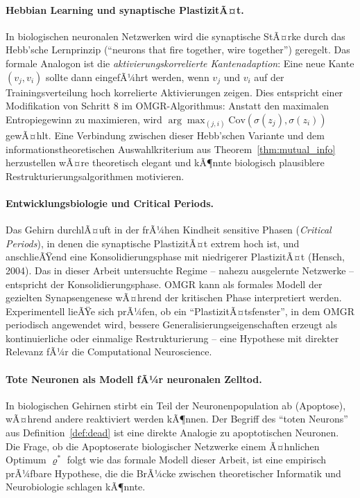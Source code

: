 ﻿\documentclass[12pt, a4paper, openany]{report}
\begin{document}
\paragraph{Hebbian Learning und synaptische PlastizitÃ¤t.}
In biologischen neuronalen Netzwerken wird die synaptische StÃ¤rke durch
das Hebb'sche Lernprinzip (``neurons that fire together, wire together'')
geregelt.  Das formale Analogon ist die \emph{aktivierungskorrelierte
Kantenadaption}: Eine neue Kante $(v_j, v_i)$ sollte dann eingefÃ¼hrt
werden, wenn $v_j$ und $v_i$ auf der Trainingsverteilung hoch korrelierte
Aktivierungen zeigen.  Dies entspricht einer Modifikation von Schritt 8 im
OMGR-Algorithmus: Anstatt den maximalen Entropiegewinn zu maximieren,
wird $\arg\max_{(j,i)} \mathrm{Cov}(\sigma(z_j), \sigma(z_i))$ gewÃ¤hlt.
Eine Verbindung zwischen dieser Hebb'schen Variante und dem
informationstheoretischen Auswahlkriterium aus Theorem~\ref{thm:mutual_info}
herzustellen wÃ¤re theoretisch elegant und kÃ¶nnte biologisch plausiblere
Restrukturierungsalgorithmen motivieren.

\paragraph{Entwicklungsbiologie und Critical Periods.}
Das Gehirn durchlÃ¤uft in der frÃ¼hen Kindheit sensitive Phasen
(\emph{Critical Periods}), in denen die synaptische PlastizitÃ¤t extrem
hoch ist, und anschlieÃŸend eine Konsolidierungsphase mit niedrigerer
PlastizitÃ¤t (Hensch, 2004).  Das in dieser Arbeit untersuchte Regime --
nahezu ausgelernte Netzwerke -- entspricht der Konsolidierungsphase.
OMGR kann als formales Modell der gezielten Synapsengenese wÃ¤hrend
der kritischen Phase interpretiert werden.  Experimentell lieÃŸe sich
prÃ¼fen, ob ein ``PlastizitÃ¤tsfenster'', in dem OMGR periodisch angewendet
wird, bessere Generalisierungseigenschaften erzeugt als kontinuierliche
oder einmalige Restrukturierung -- eine Hypothese mit direkter
Relevanz fÃ¼r die Computational Neuroscience.

\paragraph{Tote Neuronen als Modell fÃ¼r neuronalen Zelltod.}
In biologischen Gehirnen stirbt ein Teil der Neuronenpopulation ab
(Apoptose), wÃ¤hrend andere reaktiviert werden kÃ¶nnen.  Der Begriff des
``toten Neurons'' aus Definition~\ref{def:dead} ist eine direkte Analogie
zu apoptotischen Neuronen.  Die Frage, ob die Apoptoserate biologischer
Netzwerke einem Ã¤hnlichen Optimum $\varrho^*$ folgt wie das formale Modell
dieser Arbeit, ist eine empirisch prÃ¼fbare Hypothese, die die BrÃ¼cke
zwischen theoretischer Informatik und Neurobiologie schlagen kÃ¶nnte.
\end{document}
